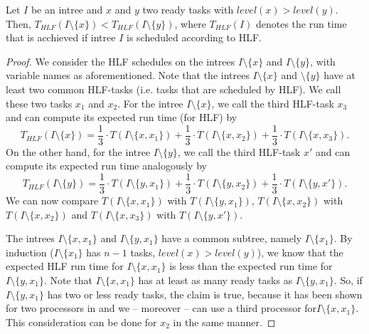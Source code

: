 \begin{lemma}
  \label{lemma:parallel-chains-flatness}
  Let $I$ be an intree and $x$ and $y$ two ready tasks with $level(x) > level(y)$. Then, $T_{HLF}(I\setminus\{ x \}) < T_{HLF}(I\setminus\{ y \})$, where $T_{HLF}(I)$ denotes the run time that is acchieved if intree $I$ is scheduled according to HLF.
\end{lemma}

\begin{proof}
  \newcommand{\iminus}[1]{I\setminus\{#1\}}


  We consider the HLF schedules on the intrees $I\setminus \{x\}$ and $I \setminus \{y\}$, with variable names as aforementioned. Note that the intrees $I\setminus \{x\}$ and $\setminus \{y\}$ have at least two common HLF-tasks (i.e. tasks that are scheduled by HLF). We call these two tasks $x_1$ and $x_2$. For the intree $\iminus{x}$, we call the third HLF-task $x_3$ and can compute its expected run time (for HLF) by
  \begin{equation*}
    T_{HLF}(\iminus{x}) = 
    \frac{1}{3} \cdot T(\iminus{x, x_1}) +
    \frac{1}{3} \cdot T(\iminus{x, x_2}) +
    \frac{1}{3} \cdot T(\iminus{x, x_3})
    .
  \end{equation*}
  On the other hand, for the intree $\iminus{y}$, we call the third HLF-task $x'$ and can compute its expected run time analogously by
  \begin{equation*}
    T_{HLF}(\iminus{y}) = 
    \frac{1}{3} \cdot T(\iminus{y, x_1}) +
    \frac{1}{3} \cdot T(\iminus{y, x_2}) +
    \frac{1}{3} \cdot T(\iminus{y, x'})
    .
  \end{equation*}
  We can now compare $T(\iminus{x, x_1})$ with $T(\iminus{y, x_1})$, $T(\iminus{x, x_2})$ with $T(\iminus{x, x_2})$ and $T(\iminus{x, x_3})$ with $T(\iminus{y, x'})$.
  
  The intrees $\iminus{x,x_1}$ and $\iminus{y,x_1}$ have a common subtree, namely $\iminus{x_1}$. By induction ($\iminus{x_1}$ has $n-1$ tasks, $level(x) > level(y)$), we know that the expected HLF run time for $\iminus{x,x_1}$ is less than the expected run time for $\iminus{y,x_1}$. Note that $\iminus{x, x_1}$ has at least as many ready tasks as $\iminus{y,x_1}$. So, if $\iminus{y,x_1}$ has two or less ready tasks, the claim is true, because it has been shown for two processors in \cite{chandyreynoldsshortpaper1975} and we -- moreover -- can use a third processor for$\iminus{x,x_1}$. This consideration can be done for $x_2$ in the same manner. 


\end{proof}
